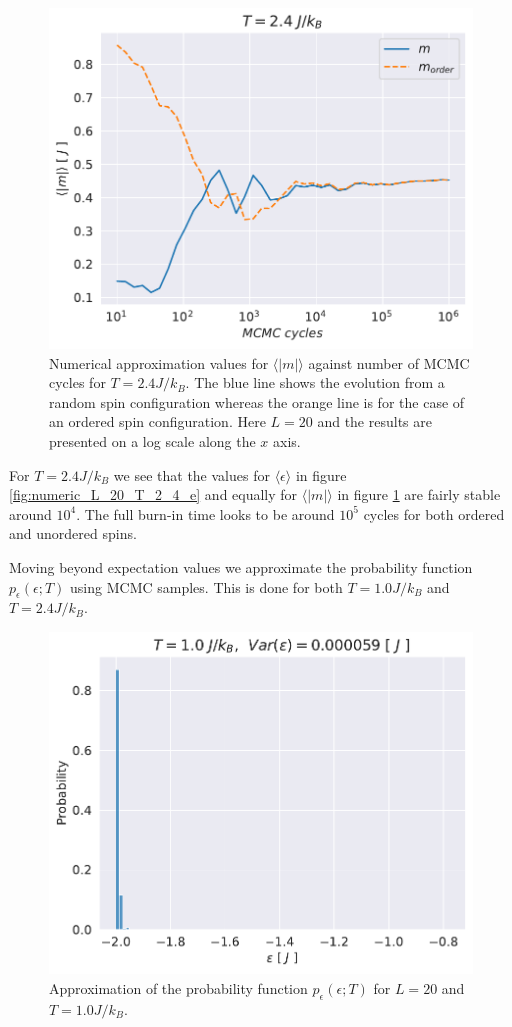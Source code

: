 \documentclass[english,notitlepage,reprint,nofootinbib]{revtex4-1}  %
\begin{document}
\begin{figure}[H]
    \centering
    \includegraphics[width=.5\textwidth]{../figures/numeric_L_20_T_2_4_m.pdf}
    \caption{Numerical approximation values for $\langle |m| \rangle$ against number of MCMC cycles for $T=2.4 J/k_B$. The blue line shows the evolution from a random spin configuration whereas the orange line is for the case of an ordered spin configuration. Here $L=20$ and the results are presented on a log scale along the $x$ axis.}
    \label{fig:numeric_L_20_T_2_4_m}
\end{figure}
For $T=2.4J/k_B$ we see that the values for $\langle \epsilon \rangle$ in figure \ref{fig:numeric_L_20_T_2_4_e} and equally for $\langle |m| \rangle$ in figure \ref{fig:numeric_L_20_T_2_4_m} are fairly stable around $10^4$. The full burn-in time looks to be around $10^5$ cycles for both ordered and unordered spins.

Moving beyond expectation values we approximate the probability function $p_{\epsilon}(\epsilon ; T)$ using MCMC samples. This is done for both $T=1.0J/k_B$ and $T=2.4J/k_B$.
\begin{figure}[H]
    \centering
    \includegraphics[width=.5\textwidth]{../figures/histogram_T_1_m.pdf}
    \caption{Approximation of the probability function $p_{\epsilon}(\epsilon ; T)$ for $L=20$ and $T=1.0 J/k_B$.}
    \label{fig:histogram_T_1_m}
\end{figure}
\end{document}
